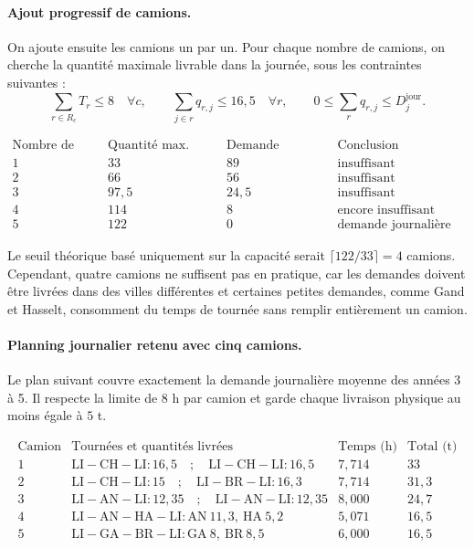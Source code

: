 \documentclass{article}
\begin{document}
\paragraph{Ajout progressif de camions.}
On ajoute ensuite les camions un par un. Pour chaque nombre de camions, on cherche
la quantité maximale livrable dans la journée, sous les contraintes suivantes :
\[
  \sum_{r \in R_c} T_r \le 8 \quad \forall c,
  \qquad
  \sum_{j \in r} q_{r,j} \le 16{,}5 \quad \forall r,
  \qquad
  0 \le \sum_r q_{r,j} \le D^{\text{jour}}_j.
\]

\[
\begin{array}{c|c|c|l}
\text{Nombre de camions} & \text{Quantité max. livrée (t/j)}
& \text{Demande restante (t/j)} & \text{Conclusion} \\
\hline
1 & 33 & 89 & \text{insuffisant} \\
2 & 66 & 56 & \text{insuffisant} \\
3 & 97{,}5 & 24{,}5 & \text{insuffisant} \\
4 & 114 & 8 & \text{encore insuffisant} \\
5 & 122 & 0 & \text{demande journalière couverte}
\end{array}
\]

Le seuil théorique basé uniquement sur la capacité serait
$\lceil 122/33\rceil = 4$ camions. Cependant, quatre camions ne suffisent pas en
pratique, car les demandes doivent être livrées dans des villes différentes et
certaines petites demandes, comme Gand et Hasselt, consomment du temps de tournée
sans remplir entièrement un camion.

\paragraph{Planning journalier retenu avec cinq camions.}
Le plan suivant couvre exactement la demande journalière moyenne des années 3 à 5.
Il respecte la limite de $8$ h par camion et garde chaque livraison physique au
moins égale à $5$ t.

\[
\begin{array}{c|l|c|c}
\text{Camion} & \text{Tournées et quantités livrées} & \text{Temps (h)} & \text{Total (t)} \\
\hline
1 &
\mathrm{LI}\!-\!\mathrm{CH}\!-\!\mathrm{LI}:16{,}5
\quad ; \quad
\mathrm{LI}\!-\!\mathrm{CH}\!-\!\mathrm{LI}:16{,}5
& 7{,}714 & 33 \\
2 &
\mathrm{LI}\!-\!\mathrm{CH}\!-\!\mathrm{LI}:15
\quad ; \quad
\mathrm{LI}\!-\!\mathrm{BR}\!-\!\mathrm{LI}:16{,}3
& 7{,}714 & 31{,}3 \\
3 &
\mathrm{LI}\!-\!\mathrm{AN}\!-\!\mathrm{LI}:12{,}35
\quad ; \quad
\mathrm{LI}\!-\!\mathrm{AN}\!-\!\mathrm{LI}:12{,}35
& 8{,}000 & 24{,}7 \\
4 &
\mathrm{LI}\!-\!\mathrm{AN}\!-\!\mathrm{HA}\!-\!\mathrm{LI}:
\mathrm{AN}\ 11{,}3,\ \mathrm{HA}\ 5{,}2
& 5{,}071 & 16{,}5 \\
5 &
\mathrm{LI}\!-\!\mathrm{GA}\!-\!\mathrm{BR}\!-\!\mathrm{LI}:
\mathrm{GA}\ 8,\ \mathrm{BR}\ 8{,}5
& 6{,}000 & 16{,}5
\end{array}
\]
\end{document}
